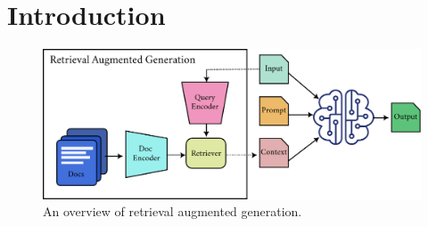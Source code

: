 \section{Introduction}
\label{sec:rag_intro}

\begin{figure}[h]
	\centering
	\includegraphics[scale=0.5]{./images/nlp/rag.pdf}
	\caption{An overview of retrieval augmented generation.}
	\label{fig:rag}
\end{figure}
